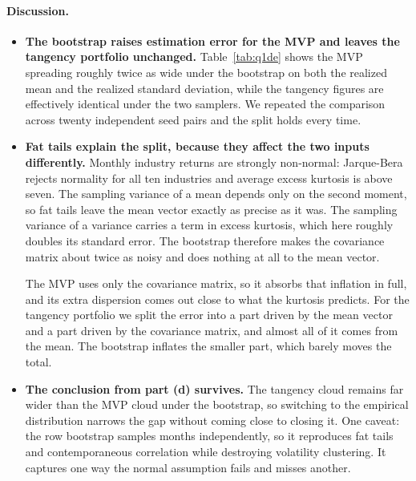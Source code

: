 \documentclass[11pt]{article}
\begin{document}
\paragraph{Discussion.}
\begin{itemize}
\setlength{\itemsep}{6pt}\setlength{\parskip}{0pt}

\item \textbf{The bootstrap raises estimation error for the MVP and leaves the
tangency portfolio unchanged.} Table~\ref{tab:q1de} shows the MVP spreading
roughly twice as wide under the bootstrap on both the realized mean and the
realized standard deviation, while the tangency figures are effectively
identical under the two samplers. We repeated the comparison across twenty
independent seed pairs and the split holds every time.

\item \textbf{Fat tails explain the split, because they affect the two inputs
differently.} Monthly industry returns are strongly non-normal: Jarque-Bera
rejects normality for all ten industries and average excess kurtosis is above
seven. The sampling variance of a mean depends only on the second moment, so
fat tails leave the mean vector exactly as precise as it was. The sampling
variance of a variance carries a term in excess kurtosis, which here roughly
doubles its standard error. The bootstrap therefore makes the covariance
matrix about twice as noisy and does nothing at all to the mean vector.

The MVP uses only the covariance matrix, so it absorbs that inflation in full,
and its extra dispersion comes out close to what the kurtosis predicts. For
the tangency portfolio we split the error into a part driven by the mean
vector and a part driven by the covariance matrix, and almost all of it comes
from the mean. The bootstrap inflates the smaller part, which barely moves the
total.

\item \textbf{The conclusion from part (d) survives.} The tangency cloud
remains far wider than the MVP cloud under the bootstrap, so switching to the
empirical distribution narrows the gap without coming close to closing it. One
caveat: the row bootstrap samples months independently, so it reproduces fat
tails and contemporaneous correlation while destroying volatility clustering.
It captures one way the normal assumption fails and misses another.

\end{itemize}

\end{document}
